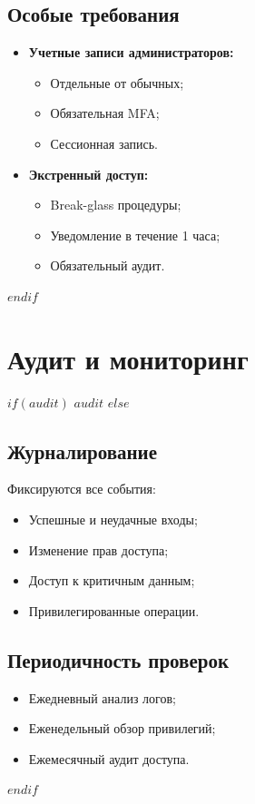 \documentclass[14pt,a4paper]{extarticle}
\begin{document}
\subsection{Особые требования}
\begin{itemize}
    \item \textbf{Учетные записи администраторов:}
    \begin{itemize}
        \item Отдельные от обычных;
        \item Обязательная MFA;
        \item Сессионная запись.
    \end{itemize}
    
    \item \textbf{Экстренный доступ:}
    \begin{itemize}
        \item Break-glass процедуры;
        \item Уведомление в течение 1 часа;
        \item Обязательный аудит.
    \end{itemize}
\end{itemize}
$endif$

\section{Аудит и мониторинг}
\label{sec:audit}

$if(audit)$
$audit$
$else$
\subsection{Журналирование}
Фиксируются все события:
\begin{itemize}
    \item Успешные и неудачные входы;
    \item Изменение прав доступа;
    \item Доступ к критичным данным;
    \item Привилегированные операции.
\end{itemize}

\subsection{Периодичность проверок}
\begin{itemize}
    \item Ежедневный анализ логов;
    \item Еженедельный обзор привилегий;
    \item Ежемесячный аудит доступа.
\end{itemize}
$endif$
\end{document}
